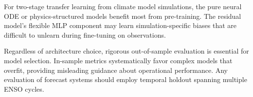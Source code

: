 For two-stage transfer learning from climate model simulations, the pure neural ODE or physics-structured models benefit most from pre-training. The residual model's flexible MLP component may learn simulation-specific biases that are difficult to unlearn during fine-tuning on observations.

Regardless of architecture choice, rigorous out-of-sample evaluation is essential for model selection. In-sample metrics systematically favor complex models that overfit, providing misleading guidance about operational performance. Any evaluation of forecast systems should employ temporal holdout spanning multiple ENSO cycles.

